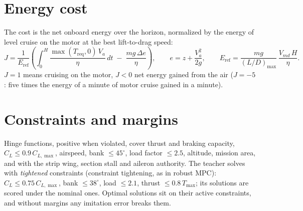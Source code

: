 \documentclass[11pt,a4paper,oneside]{report}
\newcommand{\CL}{C_L}
\newcommand{\CLmax}{C_{L,\max}}
\begin{document}
\section{Energy cost}
The cost is the net onboard energy over the horizon, normalized by the energy of level cruise on the motor at the best lift-to-drag speed:
\begin{equation}\label{eq:cost}
J = \frac{1}{E_{\mathrm{ref}}}\left(\int_0^H \frac{\max(T_{\mathrm{req}},0)\,V_a}{\eta}\,dt \;-\; \frac{m g\,\Delta e}{\eta}\right), \qquad
e = z + \frac{V_a^2}{2g}, \qquad E_{\mathrm{ref}} = \frac{mg}{(L/D)_{\max}}\,\frac{V_{md}\,H}{\eta}.
\end{equation}
$J = 1$ means cruising on the motor, $J<0$ net energy gained from the air ($J=-5$: five times the energy of a minute of motor cruise gained in a minute).

\section{Constraints and margins}
Hinge functions, positive when violated, cover thrust and braking capacity, $\CL\le 0.9\,\CLmax$, airspeed, bank $\le 45^\circ$, load factor $\le 2.5$, altitude, mission area, and with the strip wing, section stall and aileron authority. The teacher solves with \emph{tightened} constraints (constraint tightening, as in robust MPC): $\CL\le 0.75\,\CLmax$, bank $\le 38^\circ$, load $\le 2.1$, thrust $\le 0.8\,T_{\max}$; its solutions are scored under the nominal ones. Optimal solutions sit on their active constraints, and without margins any imitation error breaks them.
\end{document}
